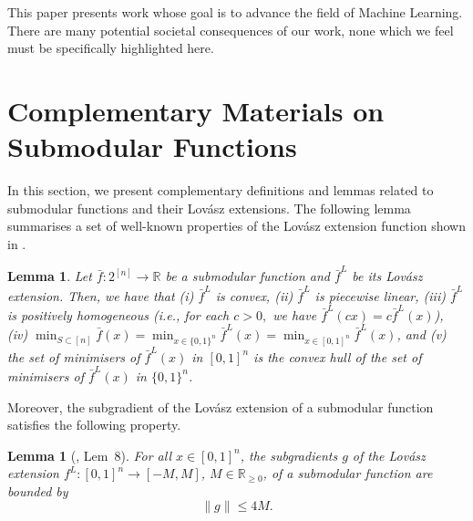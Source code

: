 \documentclass{article}
\theoremstyle{plain}
\newtheorem{lemma}[theorem]{Lemma}
\theoremstyle{definition}
\theoremstyle{remark}
\newcommand{\R}{\mathbb{R}}
\begin{document}
This paper presents work whose goal is to advance the field of Machine
Learning. There are many potential societal consequences of our work, none
which we feel must be specifically highlighted here.






\newpage
\appendix
\onecolumn

\section{Complementary Materials on Submodular Functions}\label{app:sub}
In this section, we present complementary definitions and lemmas related to submodular functions and their Lovász extensions.
The following lemma summarises a set of well-known properties of the Lovász extension function shown in \cite{lovasz1983submodular,fujishige2005submodular,bach2013learning,ando2002k}.
\begin{lemma}\label{lm:lmlova}
    Let $\bar{f}:2^{[n]}\rightarrow \mathbb{R}$ be a submodular function and $\bar{f}^L$ be its Lovász extension. Then, we have that (i) $\bar{f}^L$ is convex, (ii) $\bar{f}^L$ is piecewise linear,  (iii) $\bar{f}^L$ is positively homogeneous (i.e., for each $c>0,$ we have $\bar{f}^L(cx)=c\bar{f}^L(x)$),  (iv) $\min_{S\subset[n]} \bar{f}(x) = \min_{x\in\{0,1\}^n} \bar{f}^L(x)=\min_{x\in[0,1]^n} \bar{f}^L(x)$, and (v) the set of minimisers of $\bar{f}^L(x)$ in $[0,1]^n$ is the convex hull of the set of minimisers of $\bar{f}^L(x)$ in $\{0,1\}^n$. 
\end{lemma}
Moreover, the subgradient of the Lovász extension of a submodular function satisfies the following property.
\begin{lemma}[\cite{hazan2012online}, Lem~8]\label{lem:gxb}
For all $x\in [0,1]^n$, the
subgradients $g$ of the Lovász extension $f^L : [0,1]^n \to [-M, M]$, $M\in \R_{\geq 0}$, of a submodular function are bounded by
\[
\|g\| \leq 4M.
\]
\end{lemma}
\end{document}
